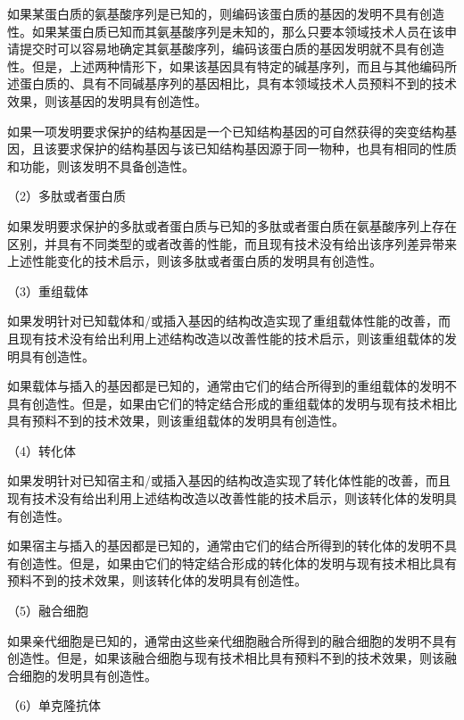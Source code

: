 如果某蛋白质的氨基酸序列是已知的，则编码该蛋白质的基因的发明不具有创造性。如果某蛋白质已知而其氨基酸序列是未知的，那么只要本领域技术人员在该申请提交时可以容易地确定其氨基酸序列，编码该蛋白质的基因发明就不具有创造性。但是，上述两种情形下，如果该基因具有特定的碱基序列，而且与其他编码所述蛋白质的、具有不同碱基序列的基因相比，具有本领域技术人员预料不到的技术效果，则该基因的发明具有创造性。

如果一项发明要求保护的结构基因是一个已知结构基因的可自然获得的突变结构基因，且该要求保护的结构基因与该已知结构基因源于同一物种，也具有相同的性质和功能，则该发明不具备创造性。

{\setlength{\parindent}{17.1bp}（2）多肽或者蛋白质\par}

如果发明要求保护的多肽或者蛋白质与已知的多肽或者蛋白质在氨基酸序列上存在区别，并具有不同类型的或者改善的性能，而且现有技术没有给出该序列差异带来上述性能变化的技术启示，则该多肽或者蛋白质的发明具有创造性。

{\setlength{\parindent}{17.1bp}（3）重组载体\par}

如果发明针对已知载体和/或插入基因的结构改造实现了重组载体性能的改善，而且现有技术没有给出利用上述结构改造以改善性能的技术启示，则该重组载体的发明具有创造性。

如果载体与插入的基因都是已知的，通常由它们的结合所得到的重组载体的发明不具有创造性。但是，如果由它们的特定结合形成的重组载体的发明与现有技术相比具有预料不到的技术效果，则该重组载体的发明具有创造性。

{\setlength{\parindent}{17.1bp}（4）转化体\par}

如果发明针对已知宿主和/或插入基因的结构改造实现了转化体性能的改善，而且现有技术没有给出利用上述结构改造以改善性能的技术启示，则该转化体的发明具有创造性。

如果宿主与插入的基因都是已知的，通常由它们的结合所得到的转化体的发明不具有创造性。但是，如果由它们的特定结合形成的转化体的发明与现有技术相比具有预料不到的技术效果，则该转化体的发明具有创造性。

{\setlength{\parindent}{17.1bp}（5）融合细胞\par}

如果亲代细胞是已知的，通常由这些亲代细胞融合所得到的融合细胞的发明不具有创造性。但是，如果该融合细胞与现有技术相比具有预料不到的技术效果，则该融合细胞的发明具有创造性。

{\setlength{\parindent}{17.1bp}（6）单克隆抗体\par}


